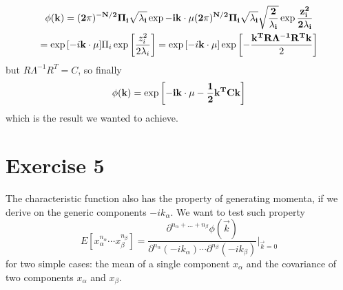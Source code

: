 \documentclass[a4paper,11pt,fleqn]{article}
\begin{document}
\begin{gather*}
    \phi(\bf{k}) = (2\pi)^{-N/2} \Pi_i\sqrt{\lambda_i} \exp{-i\bf{k}\cdot \bf{\mu}} (2\pi)^{N/2} \Pi_i \sqrt{\lambda_i} \sqrt{\frac{2}{\lambda_i}}\exp{\frac{z_i^2}{2\lambda_i}} \\
    = \exp{\left[-i\bf{k}\cdot \bf{\mu}\right]} \Pi_i \exp{\left[\frac{z_i^2}{2\lambda_i}\right]} = \exp{\left[-i\bf{k}\cdot \bf{\mu}\right]} \exp{\left[-\frac{\bf{k}^TR\Lambda^{-1} R^T\bf{k}}{2}\right]}
\end{gather*}
but $R \Lambda^{-1} R^T = C$, so finally 
\begin{gather*}
    \phi(\bf{k}) = \exp{\left[-i\bf{k}\cdot\bf{\mu}-\frac{1}{2}\bf{k}^TC\bf{k}\right]}
\end{gather*}
which is the result we wanted to achieve.





\section{Exercise 5}

The characteristic function also has the property of generating momenta, if 
we derive on the generic components $-ik_{\alpha}$. We want to test such 
property 
\begin{equation}
    \label{eqn:generation}
    E[x_{\alpha}^{n_{\alpha}} \dotsm x_{\beta}^{n_{\beta}}] = \frac{\partial^{n_\alpha+\dots+n_{\beta}}\phi(\vec{k})}{\partial^{n_\alpha}(-ik_{\alpha})\dotsm \partial^{n_\beta}(-ik_{\beta})}\Big|_{\vec{k}=0}
\end{equation}
for two simple cases: the mean of a single component $x_{\alpha}$ and the 
covariance of two components $x_{\alpha}$ and $x_{\beta}$.
\end{document}
